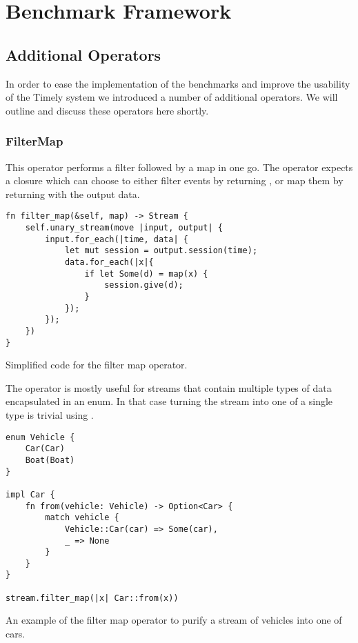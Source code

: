 \section{Benchmark Framework}


\subsection{Additional Operators}
In order to ease the implementation of the benchmarks and improve the usability of the Timely system we introduced a number of additional operators. We will outline and discuss these operators here shortly.

\subsubsection{FilterMap}
This operator performs a filter followed by a map in one go. The operator expects a closure which can choose to either filter events by returning , or map them by returning  with the output data.

\begin{listing}[H]
\begin{verbatim}
fn filter_map(&self, map) -> Stream {
    self.unary_stream(move |input, output| {
        input.for_each(|time, data| {
            let mut session = output.session(time);
            data.for_each(|x|{
                if let Some(d) = map(x) {
                    session.give(d);
                }
            });
        });
    })
}
\end{verbatim}
  \caption{Simplified code for the filter map operator.}
  \label{lst:filtermap}
\end{listing}

The operator is mostly useful for streams that contain multiple types of data encapsulated in an enum. In that case turning the stream into one of a single type is trivial using .

\begin{listing}[H]
\begin{verbatim}
enum Vehicle {
    Car(Car)
    Boat(Boat)
}

impl Car { 
    fn from(vehicle: Vehicle) -> Option<Car> {
        match vehicle {
            Vehicle::Car(car) => Some(car),
            _ => None
        }
    }
}

stream.filter_map(|x| Car::from(x))
\end{verbatim}
\caption{An example of the filter map operator to purify a stream of vehicles into one of cars.}
\label{lst:filtermap-example}
\end{listing}

